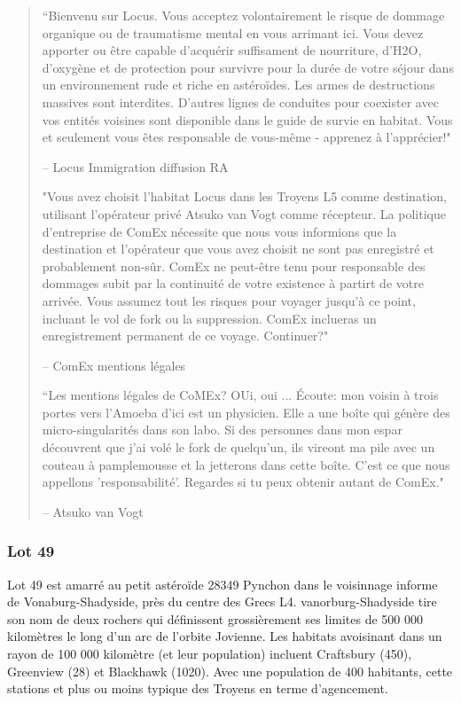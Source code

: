 \begin{quotation} “Bienvenu sur Locus. Vous acceptez volontairement le risque de dommage organique ou de traumatisme mental en vous arrimant ici. Vous devez apporter ou être capable d'acquérir suffisament de nourriture, d'H2O, d'oxygène et de protection pour survivre pour la durée de votre séjour dans un environnement rude et riche en astéroïdes. Les armes de destructions massives sont interdites. D'autres lignes de conduites pour coexister avec vos entités voisines sont disponible dans le guide de survie en habitat. Vous et seulement vous êtes responsable de vous-même - apprenez à l'apprécier!" 

-- Locus Immigration diffusion RA 

"Vous avez choisit l'habitat Locus dans les Troyens L5 comme destination, utilisant l'opérateur privé Atsuko van Vogt comme récepteur. La politique d'entreprise de ComEx nécessite que nous vous informions que la destination et l'opérateur que vous avez choisit ne sont pas enregistré et probablement non-sûr. ComEx ne peut-être tenu pour responsable des dommages subit par la continuité de votre existence à partirt de votre arrivée. Vous assumez tout les risques pour voyager jusqu'à ce point, incluant le vol de fork ou la suppression. ComEx inclueras un enregistrement permanent de ce voyage. Continuer?" 

-- ComEx mentions légales 

“Les mentions légales de CoMEx? OUi, oui ... Écoute: mon voisin à trois portes vers l'Amoeba d'ici est un physicien. Elle a une boîte qui génère des micro-singularités dans son labo. Si des personnes dans mon espar découvrent que j'ai volé le fork de quelqu'un, ils vireont ma pile avec un couteau à pamplemousse et la jetterons dans cette boîte. C'est ce que nous appellons 'responsabilité'. Regardes si tu peux obtenir autant de ComEx." 

-- Atsuko van Vogt \end{quotation} 

\subsubsection{Lot 49} \label{sec:lot-49} 

Lot 49 est amarré au petit astéroïde 28349 Pynchon dans le voisinnage informe de Vonaburg-Shadyside, près du centre des Grecs L4. vanorburg-Shadyside tire son nom de deux rochers qui définissent grossièrement ses limites de 500 000 kilomètres le long d'un arc de l'orbite Jovienne. Les habitats avoisinant dans un rayon de 100 000 kilomètre (et leur population) incluent Craftsbury (450), Greenview (28) et Blackhawk (1020). Avec une population de 400 habitants, cette stations et plus ou moins typique des Troyens en terme d'agencement. 

